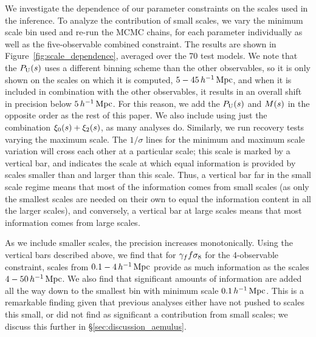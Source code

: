 We investigate the dependence of our parameter constraints on the scales used in the inference.
To analyze the contribution of small scales, we vary the minimum scale bin used and re-run the MCMC chains, for each parameter individually as well as the five-observable combined constraint.
The results are shown in Figure~\ref{fig:scale_dependence}, averaged over the 70 test models.
We note that the $P_\mathrm{U}(s)$ uses a different binning scheme than the other observables, so it is only shown on the scales on which it is computed, $5-45 \, h^{-1}\,\mathrm{Mpc}$, and when it is included in combination with the other observables, it results in an overall shift in precision below $5 \, h^{-1}\,\mathrm{Mpc}$.
For this reason, we add the $P_\mathrm{U}(s)$ and $M(s)$ in the opposite order as the rest of this paper.
We also include using just the combination $\xi_0(s) + \xi_2(s)$, as many analyses do.
Similarly, we run recovery tests varying the maximum scale.
The $1/\sigma$ lines for the minimum and maximum scale variation will cross each other at a particular scale; this scale is marked by a vertical bar, and indicates the scale at which equal information is provided by scales smaller than and larger than this scale.
Thus, a vertical bar far in the small scale regime means that most of the information comes from small scales (as only the smallest scales are needed on their own to equal the information content in all the larger scales), and conversely, a vertical bar at large scales means that most information comes from large scales. 

As we include smaller scales, the precision increases monotonically.
Using the vertical bars described above, we find that for $\gamma_f f\sigma_8$ for the 4-observable constraint, scales from $0.1-4 \, h^{-1}\,\mathrm{Mpc}$ provide as much information as the scales $4-50 \, h^{-1}\,\mathrm{Mpc}$.
We also find that significant amounts of information are added all the way down to the smallest bin with minimum scale $0.1 \, h^{-1}\,\mathrm{Mpc}$.
This is a remarkable finding given that previous analyses either have not pushed to scales this small, or did not find as significant a contribution from small scales; we discuss this further in \S\ref{sec:discussion_aemulus}.

